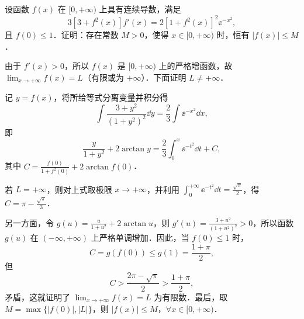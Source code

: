 设函数 $f(x)$ 在 $[0,+\infty)$ 上具有连续导数，满足
\[
  3[3+f^2(x)]f'(x)=2[1+f^2(x)]^2\ee^{-x^2},
\]
且 $f(0)\le 1$．证明：存在常数 $M>0$，使得 $x\in[0,+\infty)$ 时，恒有 $|f(x)|\le M$．
\begin{solution}
由于 $f'(x)>0$，所以 $f(x)$ 是 $[0,+\infty)$ 上的严格增函数，故 $\lim_{x\to+\infty}f(x)=L$（有限或为 $+\infty$）．下面证明 $L\ne+\infty$．

记 $y=f(x)$，将所给等式分离变量并积分得
\[
\int\frac{3+y^2}{(1+y^2)^2}\dd y=\frac{2}{3}\int\ee^{-x^2}\dd x,
\]
即
\[
\frac{y}{1+y^2}+2\arctan y=\frac{2}{3}\int_0^x\ee^{-t^2}\dd t+C,
\]
其中 $C=\frac{f(0)}{1+f^2(0)}+2\arctan f(0)$．

若 $L=+\infty$，则对上式取极限 $x\to+\infty$，并利用 $\int_0^{+\infty}\ee^{-t^2}\dd t=\frac{\sqrt\pi}{2}$，得 $C=\pi-\frac{\sqrt\pi}{3}$．

另一方面，令 $g(u)=\frac{u}{1+u^2}+2\arctan u$，则 $g'(u)=\frac{3+u^2}{(1+u^2)^2}>0$，所以函数 $g(u)$ 在 $(-\infty,+\infty)$ 上严格单调增加．因此，当 $f(0)\le1$ 时，
\[
C=g(f(0))\le g(1)=\frac{1+\pi}{2},
\]
但
\[
C>\frac{2\pi-\sqrt\pi}{2}>\frac{1+\pi}{2},
\]
矛盾，这就证明了 $\lim_{x\to+\infty}f(x)=L$ 为有限数．最后，取 $M=\max\{|f(0)|,|L|\}$，则 $|f(x)|\le M$，$\forall x\in[0,+\infty)$．
\end{solution}
